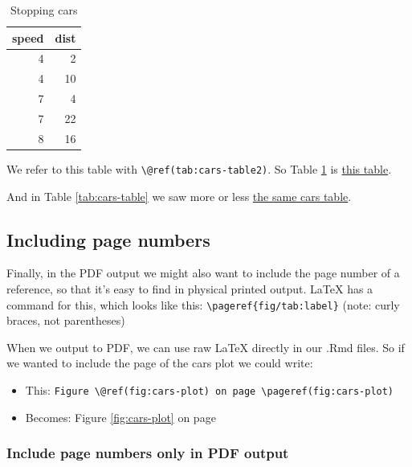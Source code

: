 \documentclass[a4paper, nobind]{templates/ociamthesis}
\providecommand{\tightlist}{%
  \setlength{\itemsep}{0pt}\setlength{\parskip}{0pt}}
\begin{document}
\begin{table}

\caption{\label{tab:cars-table2}Stopping cars}
\centering
\begin{tabular}[t]{r|r}
\hline
speed & dist\\
\hline
4 & 2\\
\hline
4 & 10\\
\hline
7 & 4\\
\hline
7 & 22\\
\hline
8 & 16\\
\hline
\end{tabular}
\end{table}

We refer to this table with \texttt{\textbackslash{}@ref(tab:cars-table2)}.
So Table \ref{tab:cars-table2} is \protect\hyperlink{tab:cars-table2}{this table}.

And in Table \ref{tab:cars-table} we saw more or less \protect\hyperlink{tab:cars-table}{the same cars table}.

\hypertarget{including-page-numbers}{%
\subsection{Including page numbers}\label{including-page-numbers}}

Finally, in the PDF output we might also want to include the page number of a reference, so that it's easy to find in physical printed output.
LaTeX has a command for this, which looks like this: \texttt{\textbackslash{}pageref\{fig/tab:label\}} (note: curly braces, not parentheses)

When we output to PDF, we can use raw LaTeX directly in our .Rmd files. So if we wanted to include the page of the cars plot we could write:

\begin{itemize}
\tightlist
\item
  This: \texttt{Figure\ \textbackslash{}@ref(fig:cars-plot)\ on\ page\ \textbackslash{}pageref(fig:cars-plot)}
\item
  Becomes: Figure \ref{fig:cars-plot} on page \pageref{fig:cars-plot}
\end{itemize}

\hypertarget{include-page-numbers-only-in-pdf-output}{%
\subsubsection{Include page numbers only in PDF output}\label{include-page-numbers-only-in-pdf-output}}
\end{document}
